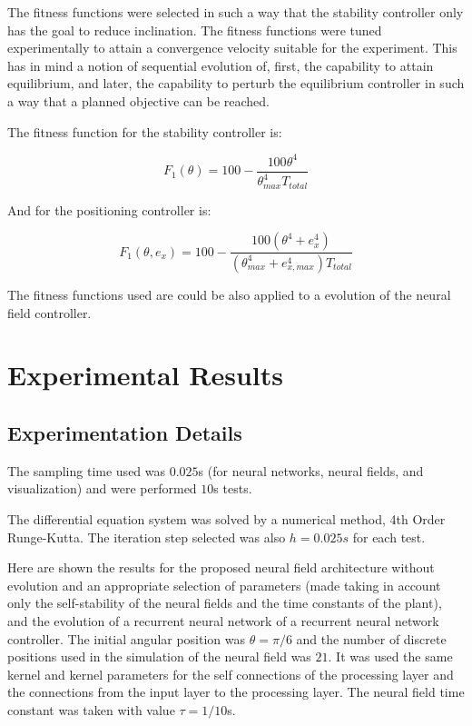 \documentclass{sig-alternate}
\begin{document}
The fitness functions were selected in such a way that the stability
controller only has the goal to reduce inclination. The fitness
functions were tuned experimentally to attain a convergence velocity
suitable for the experiment. This has in mind a notion of sequential
evolution of, first, the capability to attain equilibrium, and later,
the capability to perturb the equilibrium controller in such a way
that a planned objective can be reached.

The fitness function for the stability controller is:

\begin{equation}
  F_1(\theta )=100-\frac{100\theta ^4}{\theta _{max}^4 T_{total}}
\end{equation}

And for the positioning controller is:

\begin{equation}
  F_1(\theta ,e_x)=100-\frac{100(\theta ^4+e_x^4)}{(\theta _{max}^4+e_{x,max}^4) T_{total}}
\end{equation}

The fitness functions used are could be also applied to a evolution of
the neural field controller.

\section{Experimental Results}
\subsection*{Experimentation Details}
The sampling time used was $0.025$s (for neural networks, neural
fields, and visualization) and were performed $10$s tests.

The differential equation system was solved by a numerical method, 4th
Order Runge-Kutta. The iteration step selected was also $h=0.025s$ for
each test.

Here are shown the results for the proposed neural field architecture
without evolution and an appropriate selection of parameters (made
taking in account only the self-stability of the neural fields and the
time constants of the plant), and the evolution of a recurrent neural
network of a recurrent neural network controller. The initial angular
position was $\theta=\pi/6$ and the number of discrete positions used
in the simulation of the neural field was $21$. It was used the same
kernel and kernel parameters for the self connections of the
processing layer and the connections from the input layer to the
processing layer. The neural field time constant was taken with value
$\tau=1/10$s.
\end{document}
